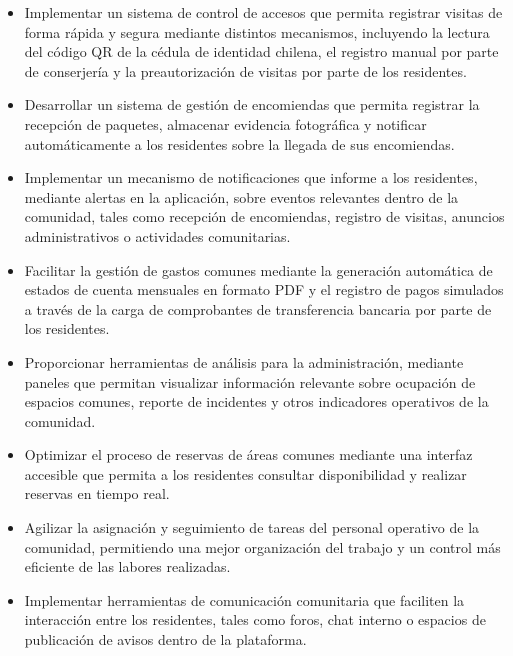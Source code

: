 \begin{itemize}

\item Implementar un sistema de control de accesos que permita registrar visitas de forma rápida y segura mediante distintos mecanismos, incluyendo la lectura del código QR de la cédula de identidad chilena, el registro manual por parte de conserjería y la preautorización de visitas por parte de los residentes.

\item Desarrollar un sistema de gestión de encomiendas que permita registrar la recepción de paquetes, almacenar evidencia fotográfica y notificar automáticamente a los residentes sobre la llegada de sus encomiendas.

\item Implementar un mecanismo de notificaciones que informe a los residentes, mediante alertas en la aplicación, sobre eventos relevantes dentro de la comunidad, tales como recepción de encomiendas, registro de visitas, anuncios administrativos o actividades comunitarias.

\item Facilitar la gestión de gastos comunes mediante la generación automática de estados de cuenta mensuales en formato PDF y el registro de pagos simulados a través de la carga de comprobantes de transferencia bancaria por parte de los residentes.

\item Proporcionar herramientas de análisis para la administración, mediante paneles que permitan visualizar información relevante sobre ocupación de espacios comunes, reporte de incidentes y otros indicadores operativos de la comunidad.

\item Optimizar el proceso de reservas de áreas comunes mediante una interfaz accesible que permita a los residentes consultar disponibilidad y realizar reservas en tiempo real.

\item Agilizar la asignación y seguimiento de tareas del personal operativo de la comunidad, permitiendo una mejor organización del trabajo y un control más eficiente de las labores realizadas.

\item Implementar herramientas de comunicación comunitaria que faciliten la interacción entre los residentes, tales como foros, chat interno o espacios de publicación de avisos dentro de la plataforma.

\end{itemize}
